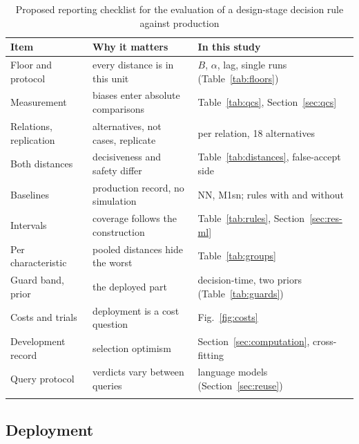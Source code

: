 \documentclass[pdflatex,sn-basic,lineno]{sn-jnl}
\newcommand{\tabsize}{\fontsize{8}{9.5}\selectfont}
\begin{document}
\begin{table}[t]
\tabsize
\setlength{\tabcolsep}{3pt}
\caption{Proposed reporting checklist for the evaluation of a design-stage decision rule against production}\label{tab:checklist}
\begin{tabular}{@{}L{2.7cm}L{4.7cm}L{5.0cm}@{}}
\toprule
Item & Why it matters & In this study \\
\midrule
Floor and protocol & every distance is in this unit & $B$, $\alpha$, lag, single runs (Table~\ref{tab:floors}) \\
Measurement & biases enter absolute comparisons & Table~\ref{tab:qcs}, Section~\ref{sec:qcs} \\
Relations, replication & alternatives, not cases, replicate & per relation, 18 alternatives \\
Both distances & decisiveness and safety differ & Table~\ref{tab:distances}, false-accept side \\
Baselines & production record, no simulation & NN, M1sn; rules with and without \\
Intervals & coverage follows the construction & Table~\ref{tab:rules}, Section~\ref{sec:res-ml} \\
Per characteristic & pooled distances hide the worst & Table~\ref{tab:groups} \\
Guard band, prior & the deployed part & decision-time, two priors (Table~\ref{tab:guards}) \\
Costs and trials & deployment is a cost question & Fig.~\ref{fig:costs} \\
Development record & selection optimism & Section~\ref{sec:computation}, cross-fitting \\
Query protocol & verdicts vary between queries & language models (Section~\ref{sec:reuse}) \\
\botrule
\end{tabular}
\end{table}

\subsection{Deployment}
\end{document}

